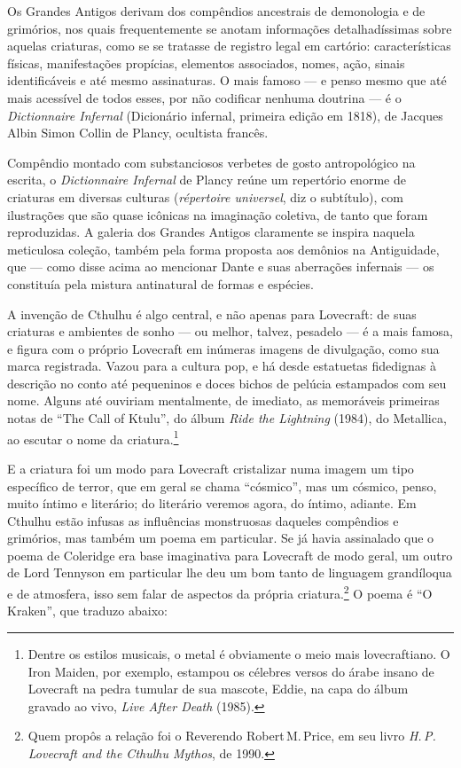 Os Grandes Antigos derivam dos compêndios ancestrais de demonologia e de
grimórios, nos quais frequentemente se anotam informações detalhadíssimas
sobre aquelas criaturas, como se se tratasse de registro legal em
cartório: características físicas, manifestações propícias, elementos
associados, nomes, ação, sinais identificáveis e até mesmo assinaturas.
O mais famoso --- e penso mesmo que até mais acessível de todos esses,
por não codificar nenhuma doutrina --- é o \emph{Dictionnaire Infernal}
(Dicionário infernal, primeira edição em 1818), de Jacques Albin Simon Collin de Plancy, ocultista francês.

Compêndio montado com substanciosos verbetes de gosto antropológico na
escrita, o \emph{Dictionnaire Infernal} de Plancy reúne um repertório
enorme de criaturas em diversas culturas (\emph{répertoire universel},
diz o subtítulo), com ilustrações que são quase icônicas na imaginação
coletiva, de tanto que foram reproduzidas. A galeria dos Grandes Antigos
claramente se inspira naquela meticulosa coleção, também pela forma
proposta aos demônios na Antiguidade, que --- como disse acima ao
mencionar Dante e suas aberrações infernais --- os constituía pela
mistura antinatural de formas e espécies.

A invenção de Cthulhu é algo central, e não apenas para Lovecraft: de
suas criaturas e ambientes de sonho --- ou melhor, talvez, pesadelo
--- é a mais famosa, e figura com o próprio Lovecraft em inúmeras
imagens de divulgação, como sua marca registrada. Vazou para a cultura
pop, e há desde estatuetas fidedignas à descrição no conto até
pequeninos e doces bichos de pelúcia estampados com seu nome. Alguns até
ouviriam mentalmente, de imediato, as memoráveis primeiras notas de
``The Call of Ktulu'', do álbum \emph{Ride the Lightning} (1984), do
Metallica, ao escutar o nome da criatura.\footnote{Dentre os estilos
  musicais, o metal é obviamente o meio mais lovecraftiano. O Iron
  Maiden, por exemplo, estampou os célebres versos do árabe insano de
  Lovecraft na pedra tumular de sua mascote, Eddie, na capa do álbum
  gravado ao vivo, \emph{Live After Death} (1985).}

E a criatura foi um modo para Lovecraft cristalizar numa imagem um tipo
específico de terror, que em geral se chama ``cósmico'', mas um cósmico,
penso, muito íntimo e literário; do literário veremos agora, do íntimo,
adiante. Em Cthulhu estão infusas as influências monstruosas daqueles
compêndios e grimórios, mas também um poema em particular. Se já havia
assinalado que o poema de Coleridge era base imaginativa para Lovecraft
de modo geral, um outro de Lord Tennyson em particular lhe
deu um bom tanto de linguagem grandíloqua e de atmosfera, isso sem falar de
aspectos da própria criatura.\footnote{Quem propôs a relação foi o
  Reverendo Robert\,M.\,Price, em seu livro \emph{H.\,P.\,Lovecraft and the
  Cthulhu Mythos}, de 1990.} O poema é ``O Kraken'', que traduzo
abaixo:

